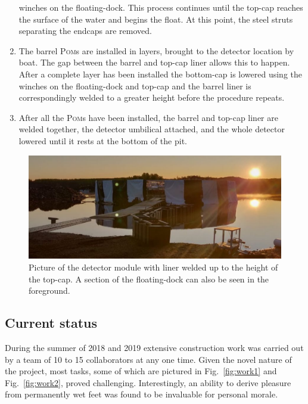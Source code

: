 \begin{enumerate}
          winches on the floating-dock. This process continues until the top-cap reaches the
          surface of the water and begins the float. At this point, the steel struts separating
          the endcaps are removed.
    \item The barrel \textsc{Pom}s are installed in layers, brought to the detector location by
          boat. The gap between the barrel and top-cap liner allows this to happen. After a
          complete layer has been installed the bottom-cap is lowered using the winches on the
          floating-dock and top-cap and the barrel liner is correspondingly welded to a greater
          height before the procedure repeats.
    \item After all the \textsc{Pom}s have been installed, the barrel and top-cap liner are welded
          together, the detector umbilical attached, and the whole detector lowered until it rests
          at the bottom of the pit.
\end{enumerate}

\begin{figure} %
    \includegraphics[width=\textwidth]{diagrams/4-chips/chips_with_liner_sun.pdf}
    \caption[Picture of the \chipsfive detector module with liner]
    {Picture of the \chipsfive detector module with liner welded up to the height of the top-cap.
        A section of the floating-dock can also be seen in the foreground.}
    \label{fig:chips_with_liner}
\end{figure}

\subsection{Current status} %
\label{sec:chips_detector_status} %

During the summer of 2018 and 2019 extensive \chipsfive construction work was carried out by a
team of 10 to 15 collaborators at any one time. Given the novel nature of the project, most tasks,
some of which are pictured in Fig.~\ref{fig:work1} and Fig.~\ref{fig:work2}, proved challenging.
Interestingly, an ability to derive pleasure from permanently wet feet was found to be invaluable
for personal morale.

